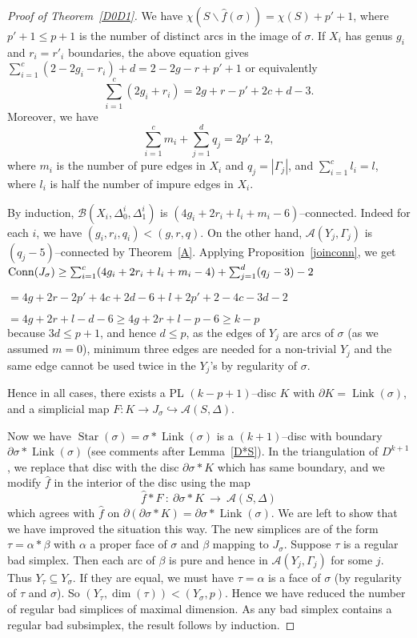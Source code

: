 \documentclass[10pt]{amsart}
\newcommand{\A}{\mathcal{A}}
\newcommand{\BB}{\mathcal{B}}
\newcommand{\al}{\alpha}
\newcommand{\Ga}{\Gamma}
\newcommand{\De}{\Delta}
\newcommand{\s}{\sigma}
\newcommand{\rar}{\longrightarrow}
\newcommand{\inc}{\hookrightarrow}
\newcommand{\minus}{\backslash}
\newcommand{\del}{\partial}
\newcommand{\link}{\operatorname{Link}}
\newcommand{\Star}{\operatorname{Star}}
\begin{document}
\begin{proof}[Proof of Theorem~\ref{D0D1}]
We have $\chi(S\minus \hat f(\s))=\chi(S)+p'+1$, where $p'+1\le p+1$ is the number of distinct arcs in the image of $\s$. 
If $X_i$ has genus $g_i$ and $r_i=r'_i$ boundaries, the above equation gives 
$\sum_{i=1}^c (2-2g_i - r_i) + d= 2-2g-r+p'+1$ or equivalently 
$$\textstyle{\sum_{i=1}^c} (2g_i + r_i)=2g+r-p'+2c+d-3.$$
Moreover, we have 
$$\textstyle{\sum_{i=1}^{c}}m_i+\textstyle{\sum_{j=1}^d} q_j=2p'+2,$$ 
where $m_i$ is the number of pure edges in $X_i$ and $q_j=|\Ga_j|$,  and $\sum_{i=1}^{c}l_i=l$,
where $l_i$ is half the number of impure edges in $X_i$.




By induction, $\BB(X_i,\De_0^i,\De_1^i)$ is $(4g_i+2r_i+l_i+m_i-6)$--connected. Indeed for each $i$, we have 
$(g_i,r_i,q_i)<(g,r,q)$.  
On the other hand, $\A(Y_j,\Ga_j)$ is  $(q_j -5)$--connected by Theorem~\ref{A}.  
Applying Proposition~\ref{joinconn},  we get \\
${\rm Conn}(J_\s)\ge \sum_{i=1}^c (4g_i + 2r_i + l_i + m_i-4) + \sum_{j=1}^d (q_j -3)-2$

$=4g+2r-2p'+4c+2d-6+l+2p'+2-4c-3d-2$

$=4g+2r+l-d-6\ge 4g+2r+l-p-6\ge k-p$\\
because $3d\le p+1$, and hence $d\le p$, 
as the edges of $Y_j$ are arcs of $\s$ (as we assumed $m=0$), 
minimum three edges are needed for a non-trivial $Y_j$ and the same edge cannot be used  
twice in the $Y_j$'s by regularity of $\s$. 

Hence in all cases, there exists a PL $(k-p+1)$--disc $K$ with $\del K=\link(\s)$, and a simplicial map
$F\colon K\to J_\s\inc\A(S,\Delta)$.   

Now we have $\Star(\s)=\s*\link(\s)$ is a $(k+1)$--disc with boundary $\del\s*\link(\s)$ (see comments after Lemma~\ref{D*S}). In the triangulation of
$D^{k+1}$, we replace that disc with the disc $\del\s* K$ which has same boundary, and we 
modify $\hat f$ in the interior of the disc using the map 
$$\hat f * F\ \colon \ \del \s * K \ \rar\  \A(S,\De)$$
which agrees with $\hat f$ on $\del(\del\s*K)=\del\s*\link(\s)$.   
We are left to show that we have improved the 
situation this way. The new simplices are of the form $\tau=\al * \beta$ with $\al$ a proper face of $\s$ and $\beta$ mapping to $J_\s$. Suppose $\tau$ is 
a regular bad simplex. Then each arc of $\beta$ is pure and hence in $\A(Y_j,\Ga_j)$ for some $j$. Thus $Y_\tau\subseteq Y_\s$. If they are 
equal, we must have $\tau=\alpha$ is a face of $\s$ (by regularity of $\tau$ and $\s$). 
So $(Y_\tau,\dim(\tau))<(Y_\s,p)$. Hence we have reduced the number of regular bad simplices of maximal dimension. As
any bad simplex contains a regular bad subsimplex, the result follows by induction. 
\end{proof}
\end{document}
